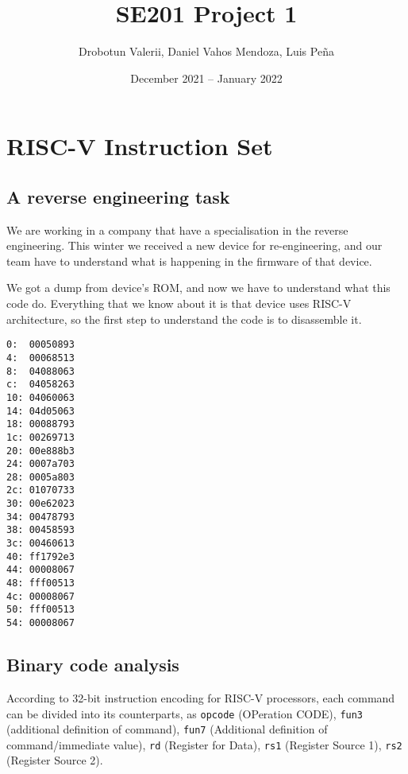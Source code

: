 \documentclass[a4paper]{article}
\author{Drobotun Valerii, Daniel Vahos Mendoza, Luis Peña}
\date{December 2021 -- January 2022}
\title{SE201 Project 1}
\begin{document}
\maketitle

\section{RISC-V Instruction Set}
\subsection{A reverse engineering task}

We are working in a company that have a specialisation in the reverse engineering. This winter we received a new device for re-engineering, and our team have to understand what is happening in the firmware of that device.

We got a dump from device's ROM, and now we have to understand what this code do. Everything that we know about it is that device uses RISC-V architecture, so the first step to understand the code is to disassemble it.

\begin{lstlisting}[language=Ant, caption=ROM dump]
0:  00050893
4:  00068513
8:  04088063
c:  04058263
10: 04060063
14: 04d05063
18: 00088793
1c: 00269713
20: 00e888b3
24: 0007a703
28: 0005a803
2c: 01070733
30: 00e62023
34: 00478793
38: 00458593
3c: 00460613
40: ff1792e3
44: 00008067
48: fff00513
4c: 00008067
50: fff00513
54: 00008067
\end{lstlisting}

\subsection{Binary code analysis}

According to 32-bit instruction encoding for RISC-V processors, each command can be divided into its counterparts, as \texttt{opcode} (OPeration CODE), \texttt{fun3} (additional definition of command), \texttt{fun7} (Additional definition of command/immediate value), \texttt{rd} (Register for Data), \texttt{rs1} (Register Source 1), \texttt{rs2} (Register Source 2).
\end{document}
